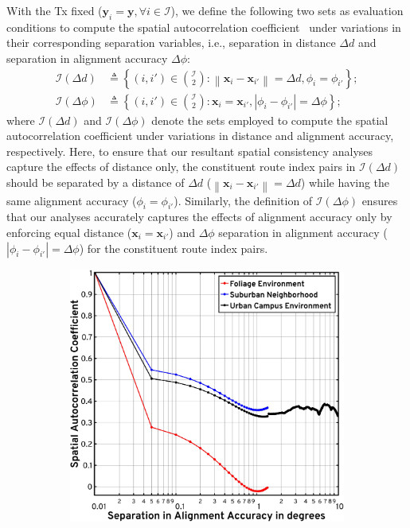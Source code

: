 \documentclass[12pt, draftcls, onecolumn]{IEEEtran}
\newcommand{\abs}[1]{\left\lvert#1\right\rvert}
\newcommand{\norm}[1]{\left\lVert#1\right\rVert}
\begin{document}
{With the Tx fixed ($\mathbf{y}_{i} = \mathbf{y}, \forall i \in \mathcal{I}$), we define the following two sets as evaluation conditions to compute the spatial autocorrelation coefficient~\cite{MacCartneySpatialStatistics} under variations in their corresponding separation variables, i.e., separation in distance $\Delta d$ and separation in alignment accuracy $\Delta \phi$:
\begin{align}\label{E}
    \mathcal{I}(\Delta d) &\triangleq \left\{(i,i') \in \binom{\mathcal{I}}{2}: \norm{\mathbf{x}_{i} - \mathbf{x}_{i'}} = \Delta d, \phi_{i} = \phi_{i'}\right\};\\
    \mathcal{I}(\Delta \phi) &\triangleq \left\{(i,i') \in \binom{\mathcal{I}}{2}: \mathbf{x}_{i} = \mathbf{x}_{i'}, \abs{\phi_{i} - \phi_{i'}} = \Delta \phi\right\}\label{Ea};
\end{align}
where $\mathcal{I}(\Delta d)$ and $\mathcal{I}(\Delta \phi)$ denote the sets employed to compute the spatial autocorrelation coefficient under variations in distance and alignment accuracy, respectively. Here, to ensure that our resultant spatial consistency analyses capture the effects of distance only, the constituent route index pairs in $\mathcal{I}(\Delta d)$ should be separated by a distance of $\Delta d$ ($\norm{\mathbf{x}_{i}{-}\mathbf{x}_{i'}}{=}\Delta d$) while having the same alignment accuracy ($\phi_{i}{=}\phi_{i'}$). Similarly, the definition of $\mathcal{I}(\Delta \phi)$ ensures that our analyses accurately captures the effects of alignment accuracy only by enforcing equal distance ($\mathbf{x}_{i}{=}\mathbf{x}_{i'}$) and $\Delta \phi$ separation in alignment accuracy ($\abs{\phi_{i}{-}\phi_{i'}}{=}\Delta \phi$) for the constituent route index pairs.
\begin{figure} [t]
    \centering
    \begin{subfigure}{0.4925\linewidth}
        \centering
        \includegraphics[width=1.0\linewidth]{figs/spatial_consistency_vs_alignment_accuracy.pdf}

\end{subfigure}
\end{figure}}
\end{document}
